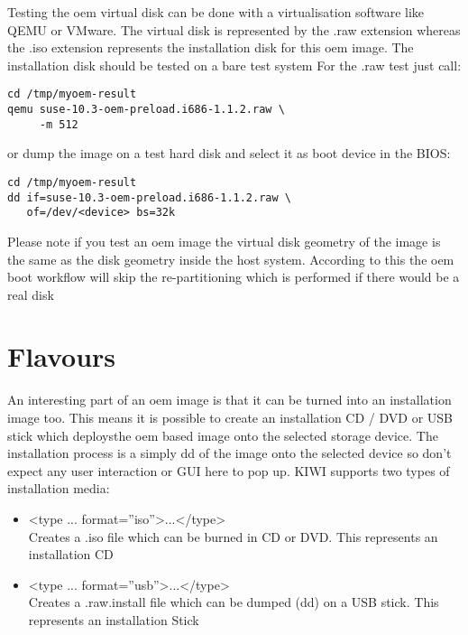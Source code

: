 Testing the oem virtual disk can be done with a virtualisation software
like QEMU or VMware. The virtual disk is represented by the .raw extension
whereas the .iso extension represents the installation disk for this oem
image. The installation disk should be tested on a bare test system
For the .raw test just call:

\begin{Command}{12cm}
\begin{verbatim}
cd /tmp/myoem-result
qemu suse-10.3-oem-preload.i686-1.1.2.raw \
     -m 512
\end{verbatim}
\end{Command}

or dump the image on a test hard disk and select it as boot device
in the BIOS:

\begin{Command}{12cm}
\begin{verbatim}
cd /tmp/myoem-result
dd if=suse-10.3-oem-preload.i686-1.1.2.raw \
   of=/dev/<device> bs=32k
\end{verbatim}
\end{Command}

Please note if you test an oem image the virtual disk geometry of the
image is the same as the disk geometry inside the host system. According
to this the oem boot workflow will skip the re-partitioning which is
performed if there would be a real disk

\section{Flavours}

An interesting part of an oem image is that it can be turned into
an installation image too. This means it is possible to create an
installation CD / DVD or USB stick which deploysthe oem based
image onto the selected storage device. The installation process
is a simply dd of the image onto the selected device so don't
expect any user interaction or GUI here to pop up. KIWI supports
two types of installation media:

\begin{itemize}
\item <type ... format=''iso''>...</type>\\
      Creates a .iso file which can be burned in CD or DVD. This
      represents an installation CD
\item <type ... format=''usb''>...</type>\\
      Creates a .raw.install file which can be dumped (dd) on a
      USB stick. This represents an installation Stick
\end{itemize}

